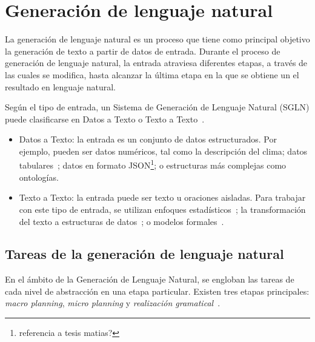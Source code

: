 \section{Generación de lenguaje natural}
\label{sec:tareas_gnl}
La generación de lenguaje natural es un proceso que tiene como principal objetivo la generación de texto a partir de datos de entrada.
Durante el proceso de generación de lenguaje natural, la entrada atraviesa diferentes etapas, a través de las cuales se modifica, hasta alcanzar la última etapa en la que se obtiene un el resultado en lenguaje natural.

Según el tipo de entrada, un Sistema de Generación de Lenguaje Natural (SGLN) puede clasificarse en Datos a Texto o Texto a Texto~\cite{vicente2015generacion}.
\begin{itemize}
    \item Datos a Texto: la entrada es un conjunto de datos estructurados. Por ejemplo, pueden ser datos numéricos, tal como la descripción del clima; datos  tabulares~\cite{mahapatra2016statistical}; datos en formato JSON\footnote{referencia a tesis matias?}; o estructuras más complejas como ontologías.
    \item Texto a Texto: la entrada puede ser texto u oraciones aisladas. Para trabajar con este tipo de entrada, se utilizan enfoques estadísticos~\cite{mittal1999ultra}; la transformación del texto a estructuras de datos~\cite{saldanha2004creation}; o modelos formales~\cite{guo2018long}.
\end{itemize}

\subsection{Tareas de la generación de lenguaje natural}
En el ámbito de la Generación de Lenguaje Natural, se engloban las tareas de cada nivel de abstracción en una etapa particular. Existen tres etapas principales: \emph{macro planning}, \emph{micro planning} y \emph{realización gramatical}~\cite{vicente2015generacion}.

